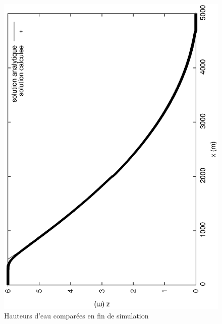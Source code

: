 \documentclass[a4paper,10pt]{article}
\begin{document}
\begin{figure}
 \begin{center}
  \includegraphics[angle=270,width=15cm]{Hauteur.eps}
  \caption{Hauteurs d'eau comparées en fin de simulation}
  \label{fig1}
 \end{center}
\end{figure}
\end{document}
